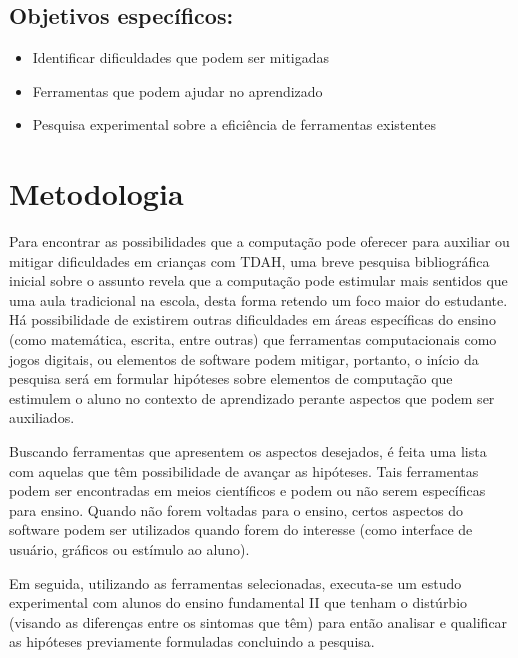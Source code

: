 \subsection{Objetivos específicos:}

\begin{itemize}
\item Identificar dificuldades que podem ser mitigadas
\item Ferramentas que podem ajudar no aprendizado
\item Pesquisa experimental sobre a eficiência de ferramentas existentes
\end{itemize}

\section{Metodologia}
Para encontrar as possibilidades que a computação pode oferecer para auxiliar ou mitigar dificuldades em crianças com TDAH, uma breve pesquisa bibliográfica inicial sobre o assunto revela que a computação pode estimular mais sentidos que uma aula tradicional na escola, desta forma retendo um foco maior do estudante. Há possibilidade de existirem outras dificuldades em áreas específicas do ensino (como matemática, escrita, entre outras) que ferramentas computacionais como jogos digitais, ou elementos de software podem mitigar, portanto, o início da pesquisa será em formular hipóteses sobre elementos de computação que estimulem o aluno no contexto de aprendizado perante aspectos que podem ser auxiliados.

Buscando ferramentas que apresentem os aspectos desejados, é feita uma lista com aquelas que têm possibilidade de avançar as hipóteses. Tais ferramentas podem ser encontradas em meios científicos e podem ou não serem específicas para ensino. Quando não forem voltadas para o ensino, certos aspectos do software podem ser utilizados quando forem do interesse (como interface de usuário, gráficos ou estímulo ao aluno).

Em seguida, utilizando as ferramentas selecionadas, executa-se um estudo experimental com alunos do ensino fundamental II que tenham o distúrbio (visando as diferenças entre os sintomas que têm) para então analisar e qualificar as hipóteses previamente formuladas concluindo a pesquisa.

